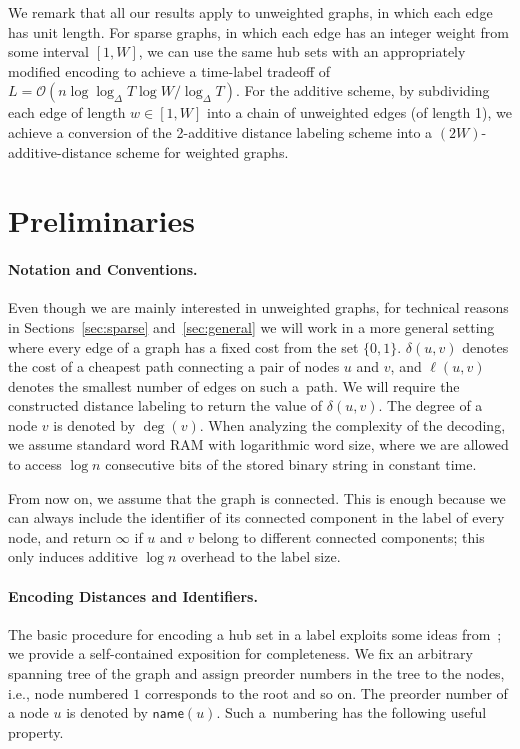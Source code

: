 \documentclass{article}[11pt,letter]
\newcommand{\bigo}{\mathcal{O}}
\newcommand{\name}{\mathsf{name}}
\newcommand{\cost}{\delta}
\newcommand{\length}{\ell}
\begin{document}
We remark that all our results apply to unweighted graphs, in which each edge has unit length. For sparse graphs, in which each edge has an integer weight from some interval $[1,W]$, we can use the same hub sets with an appropriately modified encoding to achieve a time-label tradeoff of $L = \bigo(n \log \log_\Delta T \log W/ \log_\Delta T)$. For the additive scheme, by subdividing each edge of length $w \in [1,W]$ into a chain of unweighted edges (of length 1), we achieve a conversion of the 2-additive distance labeling scheme into a $(2W)$-additive-distance scheme for weighted graphs.

\section{Preliminaries}\label{sec:preliminaries}

\paragraph{Notation and Conventions.}
Even though we are mainly interested in unweighted graphs, for technical reasons in Sections~\ref{sec:sparse} and~\ref{sec:general} we will work in a more general setting where every edge of a graph has a fixed cost from the set $\{0,1\}$. $\cost(u,v)$ denotes the cost of a cheapest path
connecting a pair of nodes $u$ and $v$, and $\length(u,v)$ denotes the smallest number of edges on such a~path. We will require the constructed distance labeling to return the value of $\cost(u,v)$. The degree of a node $v$ is denoted by $\deg(v)$. When analyzing the complexity of the decoding, we assume standard word RAM with logarithmic word size, where we are allowed to access $\log n$ consecutive bits of the stored binary string in constant time.

From now on, we assume that the graph is connected. This is enough because we can always include the identifier of its connected component in the label of every node, and return $\infty$ if $u$ and $v$ belong to different connected components; this only induces additive $\log n$ overhead to the label size.

\paragraph{Encoding Distances and Identifiers.}

The basic procedure for encoding a hub set in a label exploits some ideas from~\cite{DBLP:conf/soda/AlstrupGHP16}; we provide a self-contained exposition for completeness. We fix an arbitrary spanning tree of the graph and assign preorder numbers in the tree to the nodes, i.e., node numbered $1$ corresponds to the root and so on. The preorder number of a node $u$ is denoted by $\name(u)$. Such a~numbering has the following useful property.
\end{document}
